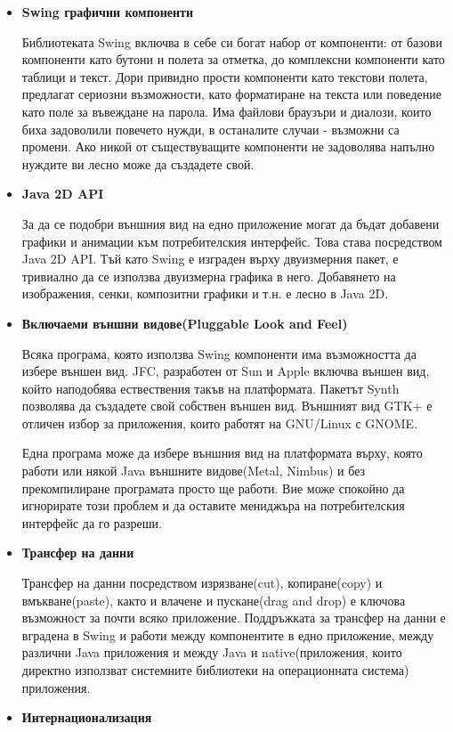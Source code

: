 \begin{itemize}
  \item \textbf{Swing графични компоненти}

    Библиотеката Swing включва в себе си богат набор от компоненти: от
    базови компоненти като бутони и полета за отметка, до комплексни
    компоненти като таблици и текст. Дори привидно прости компоненти
    като текстови полета, предлагат сериозни възможности, като
    форматиране на текста или поведение като поле за въвеждане на
    парола. Има файлови браузъри и диалози, които биха задоволили
    повечето нужди, в останалите случаи - възможни са промени. Ако
    никой от съществуващите компоненти не задоволява напълно нуждите ви
    лесно може да създадете свой.
  \item \textbf{Java 2D API}

    За да се подобри външния вид на едно приложение могат да бъдат
    добавени графики и анимации към потребителския интерфейс. Това
    става посредством Java 2D API. Тъй като Swing е изграден върху
    двуизмерния пакет, е тривиално да се използва двуизмерна графика в
    него. Добавянето на изображения, сенки, композитни графики и
    т.н. е лесно в Java 2D.
  \item \textbf{Включаеми външни видове(Pluggable Look and Feel)}
    
    Всяка програма, която използва Swing компоненти има възможността
    да избере външен вид. JFC, разработен от Sun и Apple включва външен
    вид, който наподобява ествествения такъв на платформата. Пакетът
    Synth позволява да създадете свой собствен външен вид. Външният
    вид GTK+ е отличен избор за приложения, които работят на GNU/Linux
    с GNOME.

    Една програма може да избере външния вид на платформата върху,
    която работи или някой Java външните видове(Metal, Nimbus) и без
    прекомпилиране програмата просто ще работи. Вие може спокойно да
    игнорирате този проблем и да оставите мениджъра на потребителския
    интерфейс да го разреши.
  \item \textbf{Трансфер на данни}
    
    Трансфер на данни посредством изрязване(cut), копиране(copy) и
    вмъкване(paste), както и влачене и пускане(drag and drop) е
    ключова възможност за почти всяко приложение. Поддръжката за
    трансфер на данни е вградена в Swing и работи между компонентите в
    едно приложение, между различни Java приложения и между Java и
    native(приложения, които директно използват системните библиотеки
    на операционната система)  приложения.
  \item \textbf{Интернационализация}


\end{itemize}
